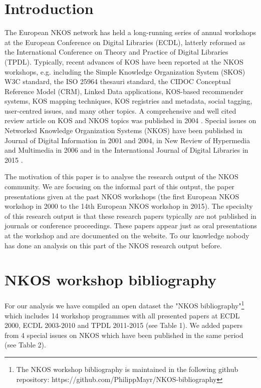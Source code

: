 \documentclass[runningheads,a4paper]{llncs}
\begin{document}
\section{Introduction}\label{intro}

The European NKOS network has held a long-running series of annual workshops at the European Conference on Digital Libraries (ECDL), latterly reformed as the International Conference on Theory and Practice of Digital Libraries (TPDL). 
Typically, recent advances of KOS have been reported at the NKOS workshops, e.g. including the Simple Knowledge Organization System (SKOS) W3C standard, the ISO 25964 thesauri standard, the CIDOC Conceptual Reference Model (CRM), Linked Data applications, KOS-based recommender systems, KOS mapping techniques, KOS registries and metadata, social tagging, user-centred issues, and many other topics. A comprehensive and well cited review article on KOS and NKOS topics was published in 2004 \cite{Zeng2004}. Special issues on Networked Knowledge Organization Systems (NKOS) have been published in Journal of Digital Information in 2001 and 2004, in New Review of Hypermedia and Multimedia in 2006 and in the International Journal of Digital Libraries in 2015 \cite{Mayr2016}. 

The motivation of this paper is to analyse the research output of the NKOS community. We are focusing on the informal part of this output, the paper presentations given at the past NKOS workshops (the first European NKOS workshop in 2000 to the 14th European NKOS workshop in 2015). The specialty of this research output is that these research papers typically are not published in journals or conference proceedings. These papers appear just as oral presentations at the workshop and are documented on the website. To our knowledge nobody has done an analysis on this part of the NKOS research output before. 



\section{NKOS workshop bibliography}\label{dataset}

For our analysis we have compiled an open dataset the "NKOS bibliography"\footnote{The NKOS workshop bibliography is maintained in the following github repository: https://github.com/PhilippMayr/NKOS-bibliography} which includes 14 workshop programmes with all presented papers at ECDL 2000, ECDL 2003-2010 and TPDL 2011-2015 (see Table 1). We added papers from 4 special issues on NKOS which have been published in the same period (see Table 2). 
\end{document}
